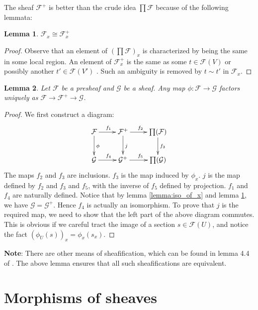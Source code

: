\documentclass{article}
\numberwithin{equation}{subsection} %
\newtheorem{lemma}{Lemma}[section]
\theoremstyle{definition}
\begin{document}
The sheaf $\mathcal{F^+}$ is better than the crude idea $\prod \mathcal{F}$ because of the following lemmata:
\begin{lemma}
	\label{lemma:f_x=f+_x}
	$\mathcal{F}_x \cong \mathcal{F}_x^+$
\end{lemma}
\begin{proof}
	Observe that an element of $(\prod \mathcal{F})_x$ is 
	characterized by being the same in some local region. 
	An element of $\mathcal{F}_x^+$ is the same as
	some $t\in \mathcal{F}(V)$ or possibly another $t'\in \mathcal{F}(V')$
	. Such an ambiguity is removed by $t\sim t'$ in $\mathcal{F}_x$.
\end{proof}

\begin{lemma}
	\label{lemma:f_f+_factor}
	Let $\mathcal{F}$ be a presheaf and $\mathcal{G}$ be a sheaf. Any map $\phi:\mathcal{F}\to \mathcal{G}$ factors uniquely as $\mathcal{F}\to \mathcal{F}^+\to \mathcal{G}$.
\end{lemma}
\begin{proof}
	We first construct a diagram:
	$$\xymatrix{
	\mathcal{F} \ar[r]^{f_1}\ar[d]^{\phi} & \mathcal{F^+} \ar[d]^{j}\ar[r]^{f_2} & \prod(\mathcal{F}) \ar[d]^{f_3}\\
	\mathcal{G} \ar[r]^{f_4} & \mathcal{G^+} \ar[r]^{f_5} & \prod( \mathcal{G})
	}$$
	The maps ${f_2}$ and ${f_3}$ are inclusions. ${f_3}$ is the map induced by
	$\phi_x$. $j$ is the map defined by ${f_2}$ and ${f_3}$ and ${f_5}$, with the
	inverse of ${f_5}$ defined by projection. ${f_1}$ and ${f_4}$ are naturally defined. Notice that by lemma \ref{lemma:iso_of_x} and lemma
	\ref{lemma:f_x=f+_x}, we have $ \mathcal{G} = \mathcal{G^+}$. Hence
	${f_4}$ is actually an isomorphism. To prove that $j$ is the
	required map, we need to show that the left part of the
	above diagram commutes. This is obvious if we careful tract the image
	of a section $s\in \mathcal{F}(U)$, and notice the fact
	$(\phi_U(s))_x= \phi_x(s_x)$.
\end{proof}
\textbf{Note}: There are other means of sheafification, which can be found in lemma 4.4 of \cite{voisin}. The above lemma ensures that all such sheafifications are equivalent.  

\section{Morphisms of sheaves}
\end{document}
